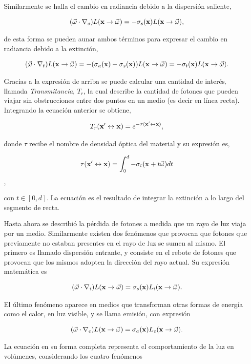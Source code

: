 Similarmente se halla el cambio en radiancia debido a la dispersión saliente,

$$ (\vec{\omega} \cdot \nabla_{o}) L(\bold{x} \rightarrow \vec{\omega}) = -\sigma_{s}(\bold{x}) L(\bold{x} \rightarrow \vec{\omega}),$$

de esta forma se pueden aunar ambos términos para expresar el cambio en radiancia debido a la extinción,

$$(\vec{\omega} \cdot \nabla_{t}) L(\bold{x} \rightarrow \vec{\omega}) = -(\sigma_{a}(\bold{x})+\sigma_{s}(\bold{x})) L(\bold{x} \rightarrow \vec{\omega}) = -\sigma_{t}(\bold{x}) L(\bold{x} \rightarrow \vec{\omega}).$$

Gracias a la expresión de arriba se puede calcular una cantidad de interés, llamada {\em Transmitancia}, $T_{r}$, la cual describe la cantidad de fotones que pueden viajar sin obstrucciones entre dos puntos en un medio (es decir en línea recta).
Integrando la ecuación anterior se obtiene,

$$T_{r}(\bold{x'} \leftrightarrow \bold{x}) = e^{-\tau(\bold{x'} \leftrightarrow \bold{x})},$$

donde $\tau$ recibe el nombre de densidad óptica del material y su expresión es,

$$\tau(\bold{x'} \leftrightarrow \bold{x}) = \int_{0}^{d} -\sigma_{t}(\bold{x}+t\vec{\omega})dt$$,

con $t \in [0,d]$.
La ecuación es el resultado de integrar la extinción a lo largo del segmento de recta.


Hasta ahora se describió la pérdida de fotones a medida que un rayo de luz viaja por un medio.
Similarmente existen dos fenómenos que provocan que fotones que previamente no estaban presentes en el rayo de luz se sumen al mismo.
El primero es llamado dispersión entrante, y consiste en el rebote de fotones que provocan que los mismos adopten la dirección del rayo actual.
Su expresión matemática es

$$ (\vec{\omega} \cdot \nabla_{i}) L(\bold{x} \rightarrow \vec{\omega}) = \sigma_{s}(\bold{x}) L_{i}(\bold{x} \rightarrow \vec{\omega}).$$

El último fenómeno aparece en medios que transforman otras formas de energía como el calor, en luz visible, y se llama emisión, con expresión

$$ (\vec{\omega} \cdot \nabla_{e}) L(\bold{x} \rightarrow \vec{\omega}) = \sigma_{a}(\bold{x}) L_{e}(\bold{x} \rightarrow \vec{\omega}).$$

La ecuación en su forma completa representa el comportamiento de la luz en volúmenes, considerando los cuatro fenómenos


